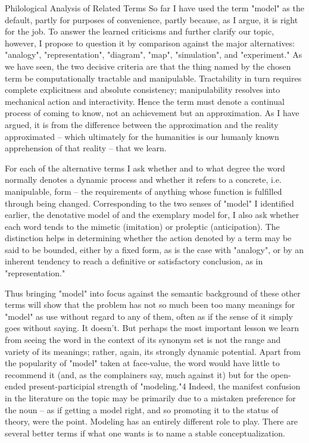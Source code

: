 Philological Analysis of Related Terms
So far I have used the term "model" as the default, partly for purposes of convenience, partly because, as I argue, it is right for the job. To answer the learned criticisms and further clarify our topic, however, I propose to question it by comparison against the major alternatives: "analogy", "representation", "diagram", "map", "simulation", and "experiment." As we have seen, the two decisive criteria are that the thing named by the chosen term be computationally tractable and manipulable. Tractability in turn requires complete explicitness and absolute consistency; manipulability resolves into mechanical action and interactivity. Hence the term must denote a continual process of coming to know, not an achievement but an approximation. As I have argued, it is from the difference between the approximation and the reality approximated – which ultimately for the humanities is our humanly known apprehension of that reality – that we learn.

For each of the alternative terms I ask whether and to what degree the word normally denotes a dynamic process and whether it refers to a concrete, i.e. manipulable, form – the requirements of anything whose function is fulfilled through being changed. Corresponding to the two senses of "model" I identified earlier, the denotative model of and the exemplary model for, I also ask whether each word tends to the mimetic (imitation) or proleptic (anticipation). The distinction helps in determining whether the action denoted by a term may be said to be bounded, either by a fixed form, as is the case with "analogy", or by an inherent tendency to reach a definitive or satisfactory conclusion, as in "representation."

Thus bringing "model" into focus against the semantic background of these other terms will show that the problem has not so much been too many meanings for "model" as use without regard to any of them, often as if the sense of it simply goes without saying. It doesn't. But perhaps the most important lesson we learn from seeing the word in the context of its synonym set is not the range and variety of its meanings; rather, again, its strongly dynamic potential. Apart from the popularity of "model" taken at face-value, the word would have little to recommend it (and, as the complainers say, much against it) but for the open-ended present-participial strength of "modeling."4 Indeed, the manifest confusion in the literature on the topic may be primarily due to a mistaken preference for the noun – as if getting a model right, and so promoting it to the status of theory, were the point. Modeling has an entirely different role to play. There are several better terms if what one wants is to name a stable conceptualization.

